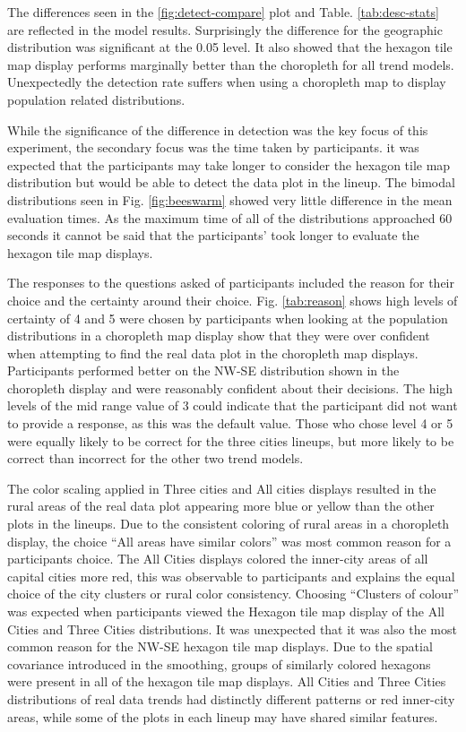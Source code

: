 \documentclass{monashthesis}
\begin{document}
The differences seen in the \ref{fig:detect-compare} plot and Table. \ref{tab:desc-stats} are reflected in the model results. Surprisingly the difference for the geographic distribution was significant at the 0.05 level.
It also showed that the hexagon tile map display performs marginally better than the choropleth for all trend models. Unexpectedly the detection rate suffers when using a choropleth map to display population related distributions.

While the significance of the difference in detection was the key focus of this experiment, the secondary focus was the time taken by participants. it was expected that the participants may take longer to consider the hexagon tile map distribution but would be able to detect the data plot in the lineup.
The bimodal distributions seen in Fig. \ref{fig:beeswarm} showed very little difference in the mean evaluation times. As the maximum time of all of the distributions approached 60 seconds it cannot be said that the participants' took longer to evaluate the hexagon tile map displays.

The responses to the questions asked of participants included the reason for their choice and the certainty around their choice.
Fig. \ref{tab:reason} shows high levels of certainty of 4 and 5 were chosen by participants when looking at the population distributions in a choropleth map display show that they were over confident when attempting to find the real data plot in the choropleth map displays. Participants performed better on the NW-SE distribution shown in the choropleth display and were reasonably confident about their decisions.
The high levels of the mid range value of 3 could indicate that the participant did not want to provide a response, as this was the default value. Those who chose level 4 or 5 were equally likely to be correct for the three cities lineups, but more likely to be correct than incorrect for the other two trend models.

The color scaling applied in Three cities and All cities displays resulted in the rural areas of the real data plot appearing more blue or yellow than the other plots in the lineups.
Due to the consistent coloring of rural areas in a choropleth display, the choice ``All areas have similar colors'' was most common reason for a participants choice. The All Cities displays colored the inner-city areas of all capital cities more red, this was observable to participants and explains the equal choice of the city clusters or rural color consistency.
Choosing ``Clusters of colour'' was expected when participants viewed the Hexagon tile map display of the All Cities and Three Cities distributions. It was unexpected that it was also the most common reason for the NW-SE hexagon tile map displays.
Due to the spatial covariance introduced in the smoothing, groups of similarly colored hexagons were present in all of the hexagon tile map displays. All Cities and Three Cities distributions of real data trends had distinctly different patterns or red inner-city areas, while some of the plots in each lineup may have shared similar features.
\end{document}
